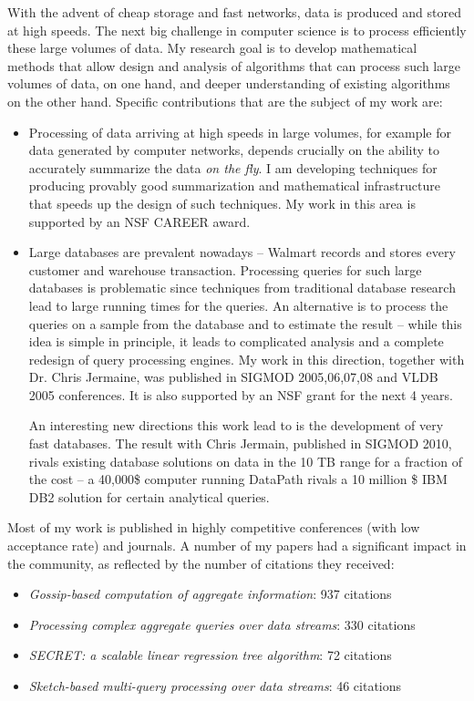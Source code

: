 \documentclass{article}
\begin{document}
With the advent of cheap storage and fast networks, data is produced
and stored at high speeds. The next big challenge in computer science
is to process efficiently these large volumes of data.  My research
goal is to develop mathematical methods that allow design and analysis
of algorithms that can process such large volumes of data, on one
hand, and deeper understanding of existing algorithms on the other
hand. Specific contributions that are the subject of my work are:
\begin{itemize}
\item Processing of data arriving at high speeds in large volumes, for
  example for data generated by computer networks, depends crucially
  on the ability to accurately summarize the data \emph{on the fly}. I
  am developing techniques for producing provably good summarization
  and mathematical infrastructure that speeds up the design of such
  techniques. My work in this area is supported by an NSF CAREER
  award.
\item Large databases are prevalent nowadays -- Walmart records and
  stores every customer and warehouse transaction. Processing queries
  for such large databases is problematic since techniques from
  traditional database research lead to large running times for the
  queries. An alternative is to process the queries on a sample from
  the database and to estimate the result -- while this idea is simple
  in principle, it leads to complicated analysis and a complete
  redesign of query processing engines. My work in this direction,
  together with Dr. Chris Jermaine, was published in SIGMOD 2005,06,07,08 and
  VLDB 2005 conferences. It is also supported by an NSF grant for the
  next 4 years.

  An interesting new directions this work lead to is the development of
  very fast databases. The result with Chris Jermain, published in
  SIGMOD 2010, rivals existing database solutions on data in the 10 TB
  range for a fraction of the cost -- a 40,000\$ computer running
  DataPath rivals a 10 million \$ IBM DB2 solution for certain
  analytical queries.

\end{itemize}

Most of my work is published in highly competitive conferences (with
low acceptance rate) and journals. A number of my papers had a
significant impact in the community, as reflected by the number of
citations they received:
\begin{itemize}
  \item \emph{Gossip-based computation of aggregate information}: 937
    citations
  \item \emph{Processing complex aggregate queries over data streams}:
    330 citations
  \item \emph{SECRET: a scalable linear regression tree algorithm}: 72
    citations
  \item \emph{Sketch-based multi-query processing over data streams}: 46 citations
\end{itemize}
\end{document}
